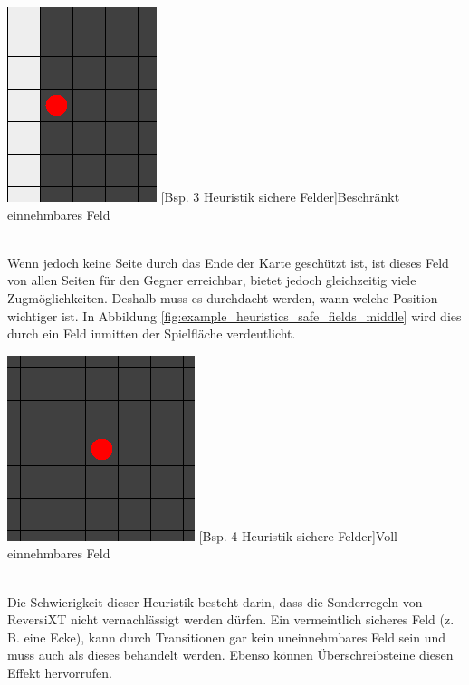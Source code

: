 \documentclass[12pt,a4paper,bibliography=totocnumbered,listof=totocnumbered]{article}
\begin{document}
\vspace{1em}
\begin{minipage}{\linewidth}
	\centering
	\includegraphics[width=0.3\linewidth]{pics/heuristics_safe_fields_outer_side.png}
	[Bsp. 3 Heuristik sichere Felder]{Beschränkt einnehmbares Feld}
	\label{fig:example_heuristics_safe_fields_outer_side}
\end{minipage}
\\

Wenn jedoch keine Seite durch das Ende der Karte geschützt ist, ist dieses Feld von allen Seiten für den Gegner erreichbar, bietet jedoch gleichzeitig viele Zugmöglichkeiten. Deshalb muss es durchdacht werden, wann welche Position wichtiger ist. In Abbildung \ref{fig:example_heuristics_safe_fields_middle} wird dies durch ein Feld inmitten der Spielfläche verdeutlicht.

\vspace{1em}
\begin{minipage}{\linewidth}
	\centering
	\includegraphics[width=0.3\linewidth]{pics/heuristics_safe_fields_middle.png}
	[Bsp. 4 Heuristik sichere Felder]{Voll einnehmbares Feld}
	\label{fig:example_heuristics_safe_fields_middle}
\end{minipage}
\\

Die Schwierigkeit dieser Heuristik besteht darin, dass die Sonderregeln von ReversiXT nicht vernachlässigt werden dürfen. Ein vermeintlich sicheres Feld (z. B. eine Ecke), kann durch Transitionen gar kein uneinnehmbares Feld sein und muss auch als dieses behandelt werden. Ebenso können Überschreibsteine diesen Effekt hervorrufen.
\end{document}
